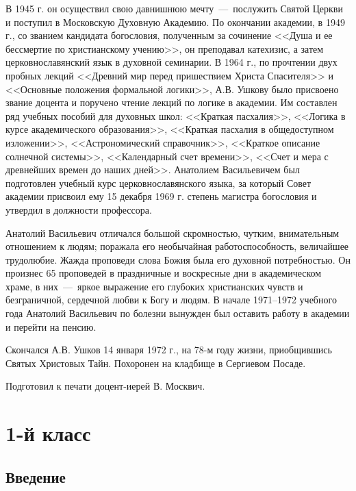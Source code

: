 \documentclass[11pt,a4paper,oneside]{memoir}
\begin{document}
        В 1945 г. он осуществил свою давнишнюю мечту~---~послужить
        Святой Церкви и поступил в Московскую Духовную Академию. По
        окончании академии, в 1949 г., со званием кандидата
        богословия, полученным за сочинение <<Душа и ее бессмертие по
        христианскому учению>>, он преподавал катехизис, а затем
        церковнославянский язык в духовной семинарии. В 1964 г., по
        прочтении двух пробных лекций <<Древний мир перед пришествием
        Христа Спасителя>> и <<Основные положения формальной
        логики>>, А.В. Ушкову было присвоено звание доцента и
        поручено чтение лекций по логике в академии. Им составлен ряд
        учебных пособий для духовных школ: <<Краткая пасхалия>>,
        <<Логика в курсе академического образования>>, <<Краткая
        пасхалия в общедоступном изложении>>, <<Астрономический
        справочник>>, <<Краткое описание солнечной системы>>,
        <<Календарный счет времени>>, <<Счет и мера с древнейших
        времен до наших дней>>. Анатолием Васильевичем был
        подготовлен учебный курс церковнославянского языка, за
        который Совет академии присвоил ему 15 декабря 1969 г.
        степень магистра богословия и утвердил в должности профессора.

        Анатолий Васильевич отличался большой скромностью, чутким,
        внимательным отношением к людям; поражала его необычайная
        работоспособность, величайшее трудолюбие. Жажда проповеди
        слова Божия была его духовной потребностью. Он произнес 65
        проповедей в праздничные и воскресные дни в академическом
        храме, в них~---~яркое выражение его глубоких христианских
        чувств и безграничной, сердечной любви к Богу и людям. В
        начале 1971--1972 учебного года Анатолий Васильевич по
        болезни вынужден был оставить работу в академии и перейти на пенсию.

        Скончался А.В. Ушков 14 января 1972 г., на 78-м году жизни,
        приобщившись Святых Христовых Тайн. Похоронен на кладбище в
        Сергиевом Посаде.

        \medskip
        Подготовил к печати доцент-иерей В. Москвич.

        \chapter*{1-й класс}
        \label{ch:firstgrade}
        \section*{Введение}
        \label{sec:intro}
\end{document}
